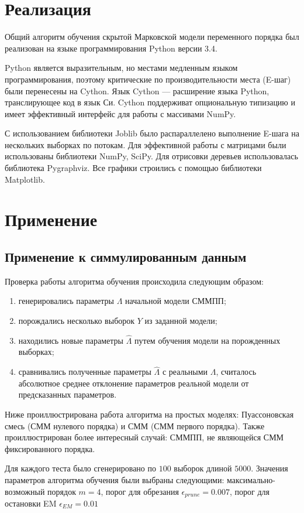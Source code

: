 \documentclass{matmex-diploma-custom}
\begin{document}
\section{Реализация}
Общий алгоритм обучения скрытой Марковской модели переменного порядка был реализован на языке программирования Python версии 3.4.
 
Python является выразительным, но местами медленным языком программирования, поэтому критические по производительности места (E-шаг) были перенесены на Cython. Язык Cython --- расширение языка Python, транслирующее код в язык Си. Cython поддерживат опциональную типизацию и имеет эффективный интерфейс для работы с массивами NumPy.

С использованием библиотеки Joblib было распараллелено выполнение E-шага на нескольких выборках по потокам. Для эффективной работы с матрицами были использованы библиотеки NumPy, SciPy. Для отрисовки деревьев использовалась библиотека Pygraphviz. Все графики строились с помощью библиотеки Matplotlib.


\section{Применение}
\subsection{Применение к симмулированным данным}
Проверка работы алгоритма обучения происходила следующим образом:
\begin{enumerate}
\item
генерировались параметры $\Lambda$ начальной модели СММПП;
\item
порождались несколько выборок $ Y $ из заданной модели;
\item
находились новые параметры $\hat{\Lambda}$ путем обучения модели на порожденных выборках;
\item
сравнивались полученные параметры $\hat{\Lambda}$ с реальными $\Lambda$,
считалось абсолютное среднее отклонение параметров реальной модели от предсказанных параметров. 
\end{enumerate}

Ниже проиллюстрирована работа алгоритма на простых моделях: Пуассоновская смесь (СММ нулевого порядка) и СММ (СММ первого порядка). Также проиллюстрирован более интересный случай: СММПП, не являющейся СММ фиксированного порядка.

Для каждого теста было сгенерировано по $100$ выборок длиной $5000$.
Значения параметров алгоритма обучения были выбраны следующими: максимально-возможный порядок $m=4$, порог для обрезания $ \epsilon_{\textit{prune}} = 0.007$, порог для остановки EM $\epsilon_{\textit{EM}} =  0.01 $ 
\end{document}
